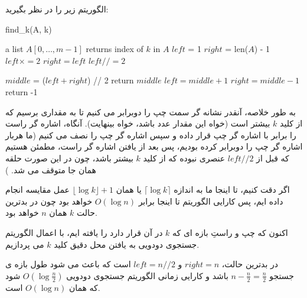\documentclass{article}
\begin{document}
الگوریتم زیر را در نظر بگیرید:

\begin{latin}
    \begin{algorithm}[H]
        \caption*{find\_k(A, k)}
        \begin{algorithmic}
            \Require a list $A[0, \ldots, m-1]$ 
            \Ensure returns index of $k$ in $A$
            \State $left$ = 1
            \State $right$ = len($A$) - 1
                \State $left \times = 2$                
            \EndWhile
            \State $right = left$
            \State $left //= 2$

                $middle$ = ($left + right$) // 2
                    \State return $middle$
                    \State $left = middle + 1$
                \Else
                    \State $right = middle -1$
                \EndIf
            \EndWhile
            \State return -1
        \end{algorithmic}
    \end{algorithm}
\end{latin}

به طور خلاصه، آنقدر نشانه گر سمت چپ را دوبرابر می کنیم
تا به مقداری برسیم که از کلید
$k$
بیشتر است (خواه این مقدار عدد باشد، خواه بینهایت).
آنگاه، اشاره گر راست را برابر با اشاره گر چپ قرار داده و سپس اشاره گر چپ را نصف
می کنیم (ما هربار اشاره گر چپ را دوبرابر کرده بودیم، پس بعد از یافتن اشاره گر راست، مطمئن
هستیم که قبل از 
$left // 2$
عنصری نبوده که از کلید
$k$
بیشتر باشد، چون در این صورت حلقه همان جا متوقف می شد.
)

اگر دقت کنیم، تا اینجا ما به اندازه 
$\lceil \log k \rceil$
یا همان
$\lfloor \log k \rfloor + 1$
عمل مقایسه انجام داده ایم، پس کارایی الگوریتم تا اینجا برابر
$O(\log n)$
خواهد بود چون در بدترین حالت
$k$
همان $n$ خواهد بود.

اکنون که چپ و راستِ بازه ای که
$k$
در آن قرار دارد را یافته ایم، با اعمال الگوریتم جستجوی دودویی
به یافتن محل دقیق کلید
$k$
می پردازیم. 

در بدترین حالت،
$right = n$
و
$left = n//2$
است که باعث می شود طول
بازه ی جستجو
$n - \frac{n}{2} = \frac{n}{2}$
باشد و کارایی زمانی الگوریتم جستجوی دودویی
$O(\log \frac{n}{2})$
شود که همان
$O(\log n)$
است.
\end{document}
